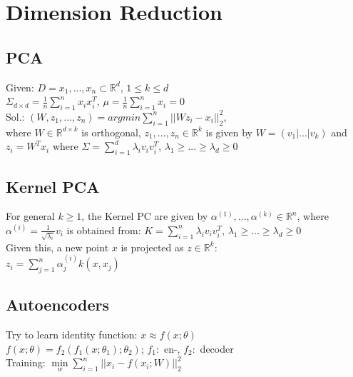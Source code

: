 \section{Dimension Reduction}
\subsection*{PCA}

Given: $D={x_1,...,x_n} \subset \mathbb{R}^d$, $1\leq k \leq d$\\
$\Sigma_{d \times d} = \frac{1}{n}\sum_{i=1}^n x_i x_i^T$, $\mu =\frac{1}{n}\sum_{i = 1}^n x_i = 0$\\
Sol.:
$(W,z_1,...,z_n) = argmin \sum_{i=1}^n||W z_i - x_i||_2^2$,\\
where $W \in \mathbb{R}^{d \times k}$ is orthogonal, $z_1,...,z_n\in\mathbb{R}^k$ is given by $W = (v_1|...|v_k)$ and $z_i = W^T x_i$ where $\Sigma = \sum_{i=1}^d \lambda_i v_i v_i^T$, $\lambda_1 \geq ... \geq \lambda_d \geq 0$

\subsection*{Kernel PCA}
For general $k\geq1$, the Kernel PC are given by $\alpha^{(1)},...,\alpha^{(k)}\in \mathbb{R}^n$, where $\alpha^{(i)} = \frac{1}{\sqrt{\lambda_i}}v_i$ is obtained from: $K = \sum_{i=1}^n \lambda_i v_i v_i^T$, $\lambda_1 \geq ... \geq \lambda_d \geq 0$\\
Given this, a new point $x$ is projected as $z \in \mathbb{R}^k$:\\
$z_i = \sum_{j=1}^n\alpha_j^{(i)}k(x,x_j)$

\subsection*{Autoencoders}
Try to learn identity function: $x \approx f(x;\theta)$\\
$f(x;\theta) = f_2(f_1(x;\theta_1);\theta_2)$; $f_1:$ en-, $f_2:$ decoder\\
Training: $ \underset{w}{\operatorname{min}}\sum_{i=1}^n||x_i-f(x_i;W)||_2^2$